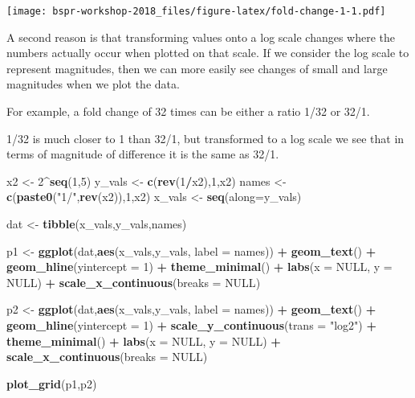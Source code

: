 \documentclass[12pt,]{book}
\newenvironment{Shaded}{\begin{snugshade}}{\end{snugshade}}
\newcommand{\KeywordTok}[1]{\textcolor[rgb]{0.13,0.29,0.53}{\textbf{#1}}}
\newcommand{\DataTypeTok}[1]{\textcolor[rgb]{0.13,0.29,0.53}{#1}}
\newcommand{\DecValTok}[1]{\textcolor[rgb]{0.00,0.00,0.81}{#1}}
\newcommand{\StringTok}[1]{\textcolor[rgb]{0.31,0.60,0.02}{#1}}
\newcommand{\OtherTok}[1]{\textcolor[rgb]{0.56,0.35,0.01}{#1}}
\newcommand{\OperatorTok}[1]{\textcolor[rgb]{0.81,0.36,0.00}{\textbf{#1}}}
\newcommand{\NormalTok}[1]{#1}
\theoremstyle{definition}
\theoremstyle{definition}
\theoremstyle{definition}
\theoremstyle{remark}
\begin{document}
\texttt{[image: bspr-workshop-2018\_files/figure-latex/fold-change-1-1.pdf]}

A second reason is that transforming values onto a log scale changes
where the numbers actually occur when plotted on that scale. If we
consider the log scale to represent magnitudes, then we can more easily
see changes of small and large magnitudes when we plot the data.

For example, a fold change of 32 times can be either a ratio 1/32 or
32/1.

1/32 is much closer to 1 than 32/1, but transformed to a log scale we
see that in terms of magnitude of difference it is the same as 32/1.

\begin{Shaded}
\begin{Highlighting}[]
\NormalTok{x2 <-}\StringTok{ }\DecValTok{2}\OperatorTok{^}\KeywordTok{seq}\NormalTok{(}\DecValTok{1}\NormalTok{,}\DecValTok{5}\NormalTok{)}
\NormalTok{y_vals <-}\StringTok{ }\KeywordTok{c}\NormalTok{(}\KeywordTok{rev}\NormalTok{(}\DecValTok{1}\OperatorTok{/}\NormalTok{x2),}\DecValTok{1}\NormalTok{,x2)}
\NormalTok{names <-}\StringTok{ }\KeywordTok{c}\NormalTok{(}\KeywordTok{paste0}\NormalTok{(}\StringTok{"1/"}\NormalTok{,}\KeywordTok{rev}\NormalTok{(x2)),}\DecValTok{1}\NormalTok{,x2)}
\NormalTok{x_vals <-}\StringTok{ }\KeywordTok{seq}\NormalTok{(}\DataTypeTok{along=}\NormalTok{y_vals)}

\NormalTok{dat <-}\StringTok{ }\KeywordTok{tibble}\NormalTok{(x_vals,y_vals,names)}

\NormalTok{p1 <-}\StringTok{ }\KeywordTok{ggplot}\NormalTok{(dat,}\KeywordTok{aes}\NormalTok{(x_vals,y_vals, }\DataTypeTok{label =}\NormalTok{ names)) }\OperatorTok{+}
\StringTok{  }\KeywordTok{geom_text}\NormalTok{() }\OperatorTok{+}
\StringTok{  }\KeywordTok{geom_hline}\NormalTok{(}\DataTypeTok{yintercept =} \DecValTok{1}\NormalTok{) }\OperatorTok{+}
\StringTok{  }\KeywordTok{theme_minimal}\NormalTok{() }\OperatorTok{+}
\StringTok{  }\KeywordTok{labs}\NormalTok{(}\DataTypeTok{x =} \OtherTok{NULL}\NormalTok{, }\DataTypeTok{y =} \OtherTok{NULL}\NormalTok{) }\OperatorTok{+}
\StringTok{  }\KeywordTok{scale_x_continuous}\NormalTok{(}\DataTypeTok{breaks =} \OtherTok{NULL}\NormalTok{)}


\NormalTok{p2 <-}\StringTok{ }\KeywordTok{ggplot}\NormalTok{(dat,}\KeywordTok{aes}\NormalTok{(x_vals,y_vals, }\DataTypeTok{label =}\NormalTok{ names)) }\OperatorTok{+}
\StringTok{  }\KeywordTok{geom_text}\NormalTok{() }\OperatorTok{+}
\StringTok{  }\KeywordTok{geom_hline}\NormalTok{(}\DataTypeTok{yintercept =} \DecValTok{1}\NormalTok{) }\OperatorTok{+}
\StringTok{  }\KeywordTok{scale_y_continuous}\NormalTok{(}\DataTypeTok{trans =} \StringTok{"log2"}\NormalTok{) }\OperatorTok{+}
\StringTok{  }\KeywordTok{theme_minimal}\NormalTok{() }\OperatorTok{+}
\StringTok{  }\KeywordTok{labs}\NormalTok{(}\DataTypeTok{x =} \OtherTok{NULL}\NormalTok{, }\DataTypeTok{y =} \OtherTok{NULL}\NormalTok{) }\OperatorTok{+}
\StringTok{  }\KeywordTok{scale_x_continuous}\NormalTok{(}\DataTypeTok{breaks =} \OtherTok{NULL}\NormalTok{)}

\KeywordTok{plot_grid}\NormalTok{(p1,p2)}
\end{Highlighting}
\end{Shaded}
\end{document}
